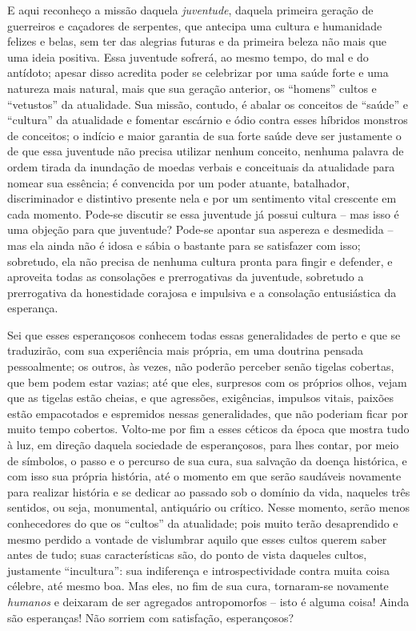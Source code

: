 \begin{enumerate}
\begin{enumerate}
    E aqui reconheço a missão daquela \emph{juventude}, daquela primeira
    geração de guerreiros e caçadores de serpentes, que antecipa uma
    cultura e humanidade felizes e belas, sem ter das alegrias futuras e
    da primeira beleza não mais que uma ideia positiva. Essa juventude
    sofrerá, ao mesmo tempo, do mal e do antídoto; apesar disso acredita
    poder se celebrizar por uma saúde forte e uma natureza mais natural,
    mais que sua geração anterior, os ``homens'' cultos e ``vetustos''
    da atualidade. Sua missão, contudo, é abalar os conceitos de
    ``saúde'' e ``cultura'' da atualidade e fomentar escárnio e ódio
    contra esses híbridos monstros de conceitos; o indício e maior
    garantia de sua forte saúde deve ser justamente o de que essa
    juventude não precisa utilizar nenhum conceito, nenhuma palavra de
    ordem tirada da inundação de moedas verbais e conceituais da
    atualidade para nomear sua essência; é convencida por um poder
    atuante, batalhador, discriminador e distintivo presente nela e por
    um sentimento vital crescente em cada momento. Pode-se discutir se
    essa juventude já possui cultura -- mas isso é uma objeção para que
    juventude? Pode-se apontar sua aspereza e desmedida -- mas ela ainda
    não é idosa e sábia o bastante para se satisfazer com isso;
    sobretudo, ela não precisa de nenhuma cultura pronta para fingir e
    defender, e aproveita todas as consolações e prerrogativas da
    juventude, sobretudo a prerrogativa da honestidade corajosa e
    impulsiva e a consolação entusiástica da esperança.

    Sei que esses esperançosos conhecem todas essas generalidades de
    perto e que se traduzirão, com sua experiência mais própria, em uma
    doutrina pensada pessoalmente; os outros, às vezes, não poderão
    perceber senão tigelas cobertas, que bem podem estar vazias; até que
    eles, surpresos com os próprios olhos, vejam que as tigelas estão
    cheias, e que agressões, exigências, impulsos vitais, paixões estão
    empacotados e espremidos nessas generalidades, que não poderiam
    ficar por muito tempo cobertos. Volto-me por fim a esses céticos da
    época que mostra tudo à luz, em direção daquela sociedade de
    esperançosos, para lhes contar, por meio de símbolos, o passo e o
    percurso de sua cura, sua salvação da doença histórica, e com isso
    sua própria história, até o momento em que serão saudáveis novamente
    para realizar história e se dedicar ao passado sob o domínio da
    vida, naqueles três sentidos, ou seja, monumental, antiquário ou
    crítico. Nesse momento, serão menos conhecedores do que os
    ``cultos'' da atualidade; pois muito terão desaprendido e mesmo
    perdido a vontade de vislumbrar aquilo que esses cultos querem saber
    antes de tudo; suas características são, do ponto de vista daqueles
    cultos, justamente ``incultura'': sua indiferença e
    introspectividade contra muita coisa célebre, até mesmo boa. Mas
    eles, no fim de sua cura, tornaram-se novamente \emph{humanos} e
    deixaram de ser agregados antropomorfos -- isto é alguma coisa!
    Ainda são esperanças! Não sorriem com satisfação, esperançosos?


\end{enumerate}
\end{enumerate}
